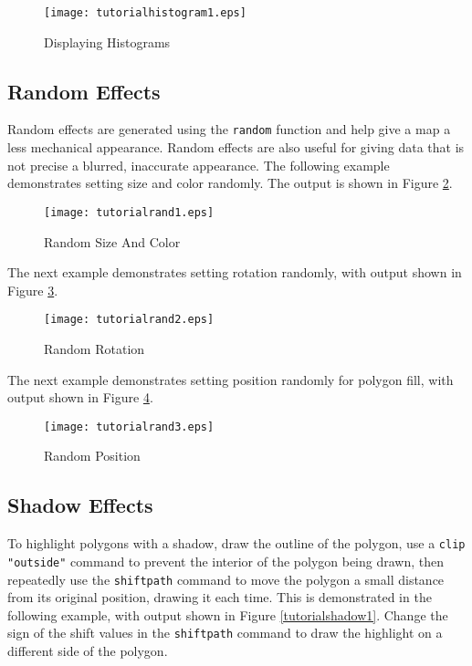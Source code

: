 \begin{figure}[htb]
\texttt{[image: tutorialhistogram1.eps]}
\caption{Displaying Histograms}
\label{tutorialhistogram1}
\end{figure}

\subsection{Random Effects}

Random effects are generated using the \texttt{random}
function and help give a map a less mechanical appearance.
Random effects are also useful for giving data that is not
precise a blurred, inaccurate appearance.
The following example demonstrates setting size and color randomly.
The output is shown in Figure \ref{tutorialrand1}.



\begin{figure}[htb]
\texttt{[image: tutorialrand1.eps]}
\caption{Random Size And Color}
\label{tutorialrand1}
\end{figure}

The next example demonstrates setting rotation randomly, with output shown in
Figure \ref{tutorialrand2}.



\begin{figure}[htb]
\texttt{[image: tutorialrand2.eps]}
\caption{Random Rotation}
\label{tutorialrand2}
\end{figure}

The next example demonstrates setting position randomly for polygon fill, with
output shown in Figure \ref{tutorialrand3}.



\begin{figure}[htb]
\texttt{[image: tutorialrand3.eps]}
\caption{Random Position}
\label{tutorialrand3}
\end{figure}

\subsection{Shadow Effects}
\label{tutorialshadow}

To highlight polygons with a shadow, draw the outline of the polygon, use a
\texttt{clip "outside"}
command to prevent the interior of the polygon being drawn,
then repeatedly use the \texttt{shiftpath} command to move the polygon a small
distance from its original position, drawing it each time.  This is
demonstrated in the following example, with output shown in Figure
\ref{tutorialshadow1}.  Change the sign of the shift values in the
\texttt{shiftpath} command to draw the highlight on a different side of the
polygon.

